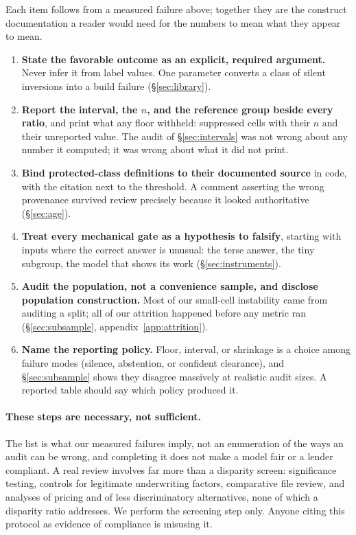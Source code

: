 \documentclass[sigconf,nonacm]{acmart}
\begin{document}
Each item follows from a measured failure above; together they are the
construct documentation a reader would need for the numbers to mean what they
appear to mean.

\begin{enumerate}
  \item \textbf{State the favorable outcome as an explicit, required
        argument.} Never infer it from label values. One parameter converts a
        class of silent inversions into a build failure
        (\S\ref{sec:library}).
  \item \textbf{Report the interval, the $n$, and the reference group beside
        every ratio}, and print what any floor withheld: suppressed cells
        with their $n$ and their unreported value. The audit of
        \S\ref{sec:intervals} was not wrong about any number it computed; it
        was wrong about what it did not print.
  \item \textbf{Bind protected-class definitions to their documented source}
        in code, with the citation next to the threshold. A comment asserting
        the wrong provenance survived review precisely because it looked
        authoritative (\S\ref{sec:age}).
  \item \textbf{Treat every mechanical gate as a hypothesis to falsify},
        starting with inputs where the correct answer is unusual: the terse
        answer, the tiny subgroup, the model that shows its work
        (\S\ref{sec:instruments}).
  \item \textbf{Audit the population, not a convenience sample, and disclose
        population construction.} Most of our small-cell instability came from
        auditing a split; all of our attrition happened before any metric ran
        (\S\ref{sec:subsample}, appendix~\ref{app:attrition}).
  \item \textbf{Name the reporting policy.} Floor, interval, or shrinkage is a
        choice among failure modes (silence, abstention, or confident
        clearance), and \S\ref{sec:subsample} shows they disagree massively
        at realistic audit sizes. A reported table should say which policy
        produced it.
\end{enumerate}

\paragraph{These steps are necessary, not sufficient.} The list is what our
measured failures imply, not an enumeration of the ways an audit can be wrong,
and completing it does not make a model fair or a lender compliant. A real
review involves far more than a disparity screen: significance testing,
controls for legitimate underwriting factors, comparative file review, and
analyses of pricing and of less discriminatory alternatives, none of which a
disparity ratio addresses. We perform the screening step only. Anyone citing
this protocol as evidence of compliance is misusing it.
\end{document}
